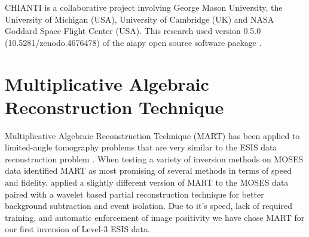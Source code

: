 	

\begin{acknowledgements}
	CHIANTI is a collaborative project involving George Mason University, the University of Michigan (USA), University of Cambridge (UK) and NASA Goddard Space Flight Center (USA).
	This research used version 0.5.0 (10.5281/zenodo.4676478) of the aiapy open source software package \citep{aiapy}.
	
	
\end{acknowledgements}



\appendix
\section{Multiplicative Algebraic Reconstruction Technique}\label{MART}
	Multiplicative Algebraic Reconstruction Technique (MART) has been applied to limited-angle tomography problems that are very similar to the ESIS data reconstruction problem \citep{Okamoto1991,Verhoeven1993}.
	When testing a variety of inversion methods on MOSES data \citet{FoxPhD} identified MART as most promising of several methods in terms of speed and fidelity.
	\citet{RustPhD} applied a slightly different version of MART to the MOSES data paired with a wavelet based partial reconstruction technique for better background subtraction and event isolation.
	Due to it's speed, lack of required training, and automatic enforcement of image positivity we have chose MART for our first inversion of Level-3 ESIS data.
	
